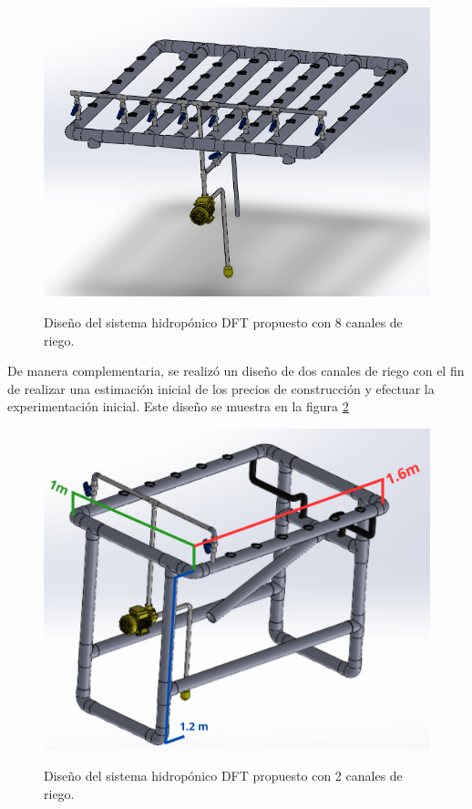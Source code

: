  \begin{figure}[H]
\centering
         \includegraphics[scale=0.75]{imgs/diseño.PNG} \\
    \caption{Diseño del sistema hidropónico DFT propuesto con 8 canales de riego. }\label{sistema3}
\end{figure}

De manera complementaria, se realizó un diseño de dos canales de riego con el fin de realizar una estimación inicial de los precios de construcción y efectuar la experimentación inicial. Este diseño se muestra en la figura \ref{sistema2Canales}
 \begin{figure}[H]
\centering
         \includegraphics[scale=0.65]{imgs/1.2.png} \\
    \caption{Diseño del sistema hidropónico DFT propuesto con 2 canales de riego. }\label{sistema2Canales}
\end{figure}

